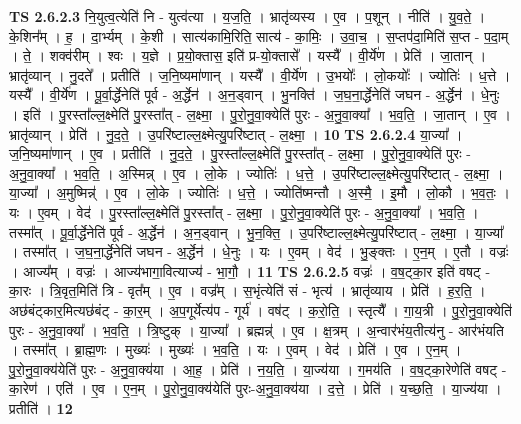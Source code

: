 \documentclass[17pt]{extarticle}
\begin{document}
                  \newline
                                \textbf{ TS 2.6.2.3} \newline
                  नि॒युत्व॒त्येति॑ नि - युत्व॑त्या । य॒ज॒ति॒ । भ्रातृ॑व्यस्य । ए॒व । प॒शून् । नीति॑ । यु॒व॒ते॒ । के॒शिन᳚म् । ह॒ । दा॒र्भ्यम् । के॒शी । सात्य॑कामि॒रिति॒ सात्य॑ - का॒मिः॒ । उ॒वा॒च॒ । स॒प्तप॑दा॒मिति॑ स॒प्त - प॒दा॒म् । ते॒ । शक्व॑रीम् । श्वः । य॒ज्ञे । प्र॒यो॒क्तास॒ इति॑ प्र-यो॒क्तासे᳚ । यस्यै᳚ । वी॒र्ये॑ण । प्रेति॑ । जा॒तान् । भ्रातृ॑व्यान् । नु॒दते᳚ । प्रतीति॑ । ज॒नि॒ष्यमा॑णान् । यस्यै᳚ । वी॒र्ये॑ण । उ॒भयोः᳚ । लो॒कयोः᳚ । ज्योतिः॑ । ध॒त्ते । यस्यै᳚ । वी॒र्ये॑ण । पू॒र्वा॒र्द्धेनेति॑ पूर्व - अ॒र्द्धेन॑ । अ॒न॒ड्वान् । भु॒नक्ति॑ । ज॒घ॒ना॒र्द्धेनेति॑ जघन - अ॒र्द्धेन॑ । धे॒नुः । इति॑ । पु॒रस्ता᳚ल्ल॒क्ष्मेति॑ पु॒रस्ता᳚त् - ल॒क्ष्मा॒ । पु॒रो॒नु॒वा॒क्येति॑ पुरः - अ॒नु॒वा॒क्या᳚ । भ॒व॒ति॒ । जा॒तान् । ए॒व । भ्रातृ॑व्यान् । प्रेति॑ । नु॒द॒ते॒ । उ॒परि॑ष्टाल्ल॒क्ष्मेत्यु॒परि॑ष्टात् - ल॒क्ष्मा॒ । \textbf{  10} \newline
                  \newline
                                \textbf{ TS 2.6.2.4} \newline
                  या॒ज्या᳚ । ज॒नि॒ष्यमा॑णान् । ए॒व । प्रतीति॑ । नु॒द॒ते॒ । पु॒रस्ता᳚ल्ल॒क्ष्मेति॑ पु॒रस्ता᳚त् - ल॒क्ष्मा॒ । पु॒रो॒नु॒वा॒क्येति॑ पुरः - अ॒नु॒वा॒क्या᳚ । भ॒व॒ति॒ । अ॒स्मिन्न् । ए॒व । लो॒के । ज्योतिः॑ । ध॒त्ते॒ । उ॒परि॑ष्टाल्ल॒क्ष्मेत्यु॒परि॑ष्टात् - ल॒क्ष्मा॒ । या॒ज्या᳚ । अ॒मुष्मिन्न्॑ । ए॒व । लो॒के । ज्योतिः॑ । ध॒त्ते॒ । ज्योति॑ष्मन्तौ । अ॒स्मै॒ । इ॒मौ । लो॒कौ । भ॒व॒तः॒ । यः । ए॒वम् । वेद॑ । पु॒रस्ता᳚ल्ल॒क्ष्मेति॑ पु॒रस्ता᳚त् - ल॒क्ष्मा॒ । पु॒रो॒नु॒वा॒क्येति॑ पुरः - अ॒नु॒वा॒क्या᳚ । भ॒व॒ति॒ । तस्मा᳚त् । पू॒र्वा॒र्द्धेनेति॑ पूर्व - अ॒र्द्धेन॑ । अ॒न॒ड्वान् । भु॒न॒क्ति॒ । उ॒परि॑ष्टाल्ल॒क्ष्मेत्यु॒परि॑ष्टात् - ल॒क्ष्मा॒ । या॒ज्या᳚ । तस्मा᳚त् । ज॒घ॒ना॒र्द्धेनेति॑ जघन - अ॒र्द्धेन॑ । धे॒नुः । यः । ए॒वम् । वेद॑ । भु॒ङ्क्तः । ए॒न॒म् । ए॒तौ । वज्रः॑ । आज्य᳚म् । वज्रः॑ । आज्य॑भागा॒वित्याज्य॑ - भा॒गौ॒ । \textbf{  11} \newline
                  \newline
                                \textbf{ TS 2.6.2.5} \newline
                  वज्रः॑ । व॒ष॒ट्का॒र इति॑ वषट् - का॒रः । त्रि॒वृत॒मिति॑ त्रि - वृत᳚म् । ए॒व । वज्र᳚म् । स॒भृंत्येति॑ सं - भृत्य॑ । भ्रातृ॑व्याय । प्रेति॑ । ह॒र॒ति॒ । अछ॑बंट्कार॒मित्यछ॑बंट् - का॒र॒म् । अ॒प॒गूर्येत्य॑प - गूर्य॑ । वष॑ट् । क॒रो॒ति॒ । स्तृत्यै᳚ । गा॒य॒त्री । पु॒रो॒नु॒वा॒क्येति॑ पुरः - अ॒नु॒वा॒क्या᳚ । भ॒व॒ति॒ । त्रि॒ष्टुक् । या॒ज्या᳚ । ब्रह्मन्न्॑ । ए॒व । क्ष॒त्रम् । अ॒न्वार॑भंय॒तीत्य॑नु - आर॑भंयति । तस्मा᳚त् । ब्रा॒ह्म॒णः । मुख्यः॑ । मुख्यः॑ । भ॒व॒ति॒ । यः । ए॒वम् । वेद॑ । प्रेति॑ । ए॒व । ए॒न॒म् । पु॒रो॒नु॒वा॒क्य॑येति॑ पुरः - अ॒नु॒वा॒क्य॑या । आ॒ह॒ । प्रेति॑ । न॒य॒ति॒ । या॒ज्य॑या । ग॒मय॑ति । व॒ष॒ट्का॒रेणेति॑ वषट् - का॒रेण॑ । एति॑ । ए॒व । ए॒न॒म् । पु॒रो॒नु॒वा॒क्य॑येति॑ पुरः-अ॒नु॒वा॒क्य॑या । द॒त्ते॒ । प्रेति॑ । य॒च्छ॒ति॒ । या॒ज्य॑या । प्रतीति॑ । \textbf{  12} \newline
\end{document}
